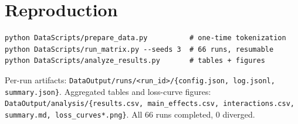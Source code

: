 \documentclass[11pt]{article}
\begin{document}



\appendix
\section{Reproduction}

\begin{verbatim}
python DataScripts/prepare_data.py          # one-time tokenization
python DataScripts/run_matrix.py --seeds 3  # 66 runs, resumable
python DataScripts/analyze_results.py       # tables + figures
\end{verbatim}

Per-run artifacts: \texttt{DataOutput/runs/<run\_id>/\{config.json, log.jsonl,
summary.json\}}. Aggregated tables and loss-curve figures:
\texttt{DataOutput/analysis/\{results.csv, main\_effects.csv, interactions.csv,
summary.md, loss\_curves*.png\}}. All 66 runs completed, 0 diverged.
\end{document}
